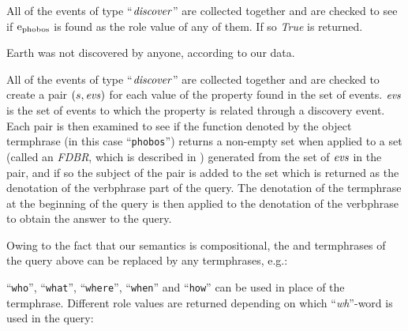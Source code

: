 \documentclass[../main.tex]{subfiles}
\begin{document}
\begin{refsection}

\examplespacing

\noindent All of the events of type ``$\operatorname{\mathit{discover}}$'' are collected together and are checked to see if $\mathrm{e}_{\operatorname{phobos}}$ is found as the  role value of any of them. If so \textit{True} is returned.

\examplespacing


\examplespacing

\noindent Earth was not discovered by anyone, according to our data.

\examplespacing


\examplespacing

\noindent All of the events of type ``$\operatorname{\mathit{discover}}$'' are collected together and are checked to create a pair $(s, \operatorname{\mathit{evs}})$ for each value of the  property found in the set of events. $\operatorname{\mathit{evs}}$ is the set of events to which the  property is related through a discovery event.  Each pair is then examined to see if the function denoted by the object termphrase (in this case ``\texttt{phobos}'') returns a non-empty set when applied to a set (called an \textit{FDBR}, which is described in ) generated from the set of $\operatorname{\mathit{evs}}$ in the pair, and if so the subject of the pair is added to the set which is returned as the denotation of the verbphrase part of the query. The denotation of the termphrase at the beginning of the query is then applied to the denotation of the verbphrase to obtain the answer to the query. %

Owing to the fact that our semantics is compositional, the  and  termphrases of the query above can be replaced by any termphrases, e.g.:

\examplespacing



\examplespacing

\noindent ``\texttt{who}'', ``\texttt{what}'', ``\texttt{where}'', ``\texttt{when}'' and ``\texttt{how}'' can be used in place of the  termphrase. Different role values are returned depending on which ``\textit{wh}''-word is used in the query:


\end{refsection}
\end{document}
